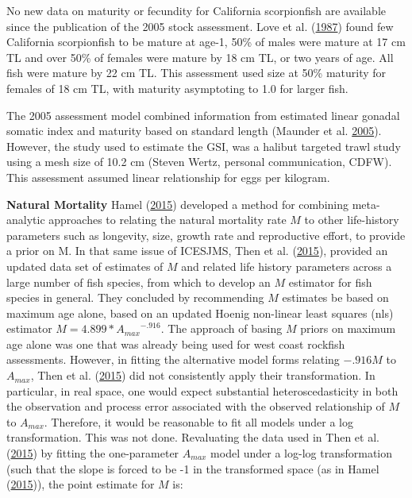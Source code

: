 \documentclass[12pt,]{article}
\begin{document}
No new data on maturity or fecundity for California scorpionfish are
available since the publication of the 2005 stock assessment. Love et
al. (\protect\hyperlink{ref-Love1987}{1987}) found few California
scorpionfish to be mature at age-1, 50\% of males were mature at 17 cm
TL and over 50\% of females were mature by 18 cm TL, or two years of
age. All fish were mature by 22 cm TL. This assessment used size at 50\%
maturity for females of 18 cm TL, with maturity asymptoting to 1.0 for
larger fish.

The 2005 assessment model combined information from estimated linear
gonadal somatic index and maturity based on standard length (Maunder et
al. \protect\hyperlink{ref-Maunder2005}{2005}). However, the study used
to estimate the GSI, was a halibut targeted trawl study using a mesh
size of 10.2 cm (Steven Wertz, personal communication, CDFW). This
assessment assumed linear relationship for eggs per kilogram.

\vspace{.5cm}

\textbf{Natural Mortality} Hamel
(\protect\hyperlink{ref-Hamel2015}{2015}) developed a method for
combining meta-analytic approaches to relating the natural mortality
rate \(M\) to other life-history parameters such as longevity, size,
growth rate and reproductive effort, to provide a prior on M. In that
same issue of ICESJMS, Then et al.
(\protect\hyperlink{ref-Then2015}{2015}), provided an updated data set
of estimates of \(M\) and related life history parameters across a large
number of fish species, from which to develop an \(M\) estimator for
fish species in general. They concluded by recommending \(M\) estimates
be based on maximum age alone, based on an updated Hoenig non-linear
least squares (nls) estimator \(M= 4.899*{A_{max}}^{-.916}\). The
approach of basing \(M\) priors on maximum age alone was one that was
already being used for west coast rockfish assessments. However, in
fitting the alternative model forms relating \(-.916M\) to \(A_{max}\),
Then et al. (\protect\hyperlink{ref-Then2015}{2015}) did not
consistently apply their transformation. In particular, in real space,
one would expect substantial heteroscedasticity in both the observation
and process error associated with the observed relationship of \(M\) to
\(A_{max}\). Therefore, it would be reasonable to fit all models under a
log transformation. This was not done. Revaluating the data used in Then
et al. (\protect\hyperlink{ref-Then2015}{2015}) by fitting the
one-parameter \(A_{max}\) model under a log-log transformation (such
that the slope is forced to be -1 in the transformed space (as in Hamel
(\protect\hyperlink{ref-Hamel2015}{2015})), the point estimate for \(M\)
is:
\end{document}
